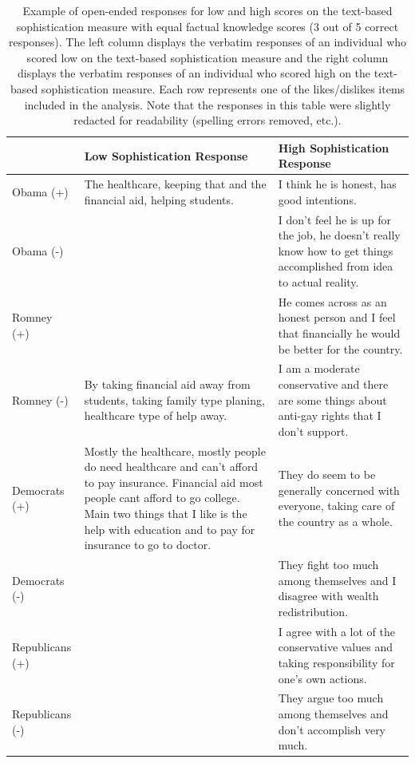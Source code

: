\documentclass[12pt]{article}
\begin{document}
\begin{table}[ht]\footnotesize\centering
\begin{tabular}{l|p{6.5cm}|p{6.5cm}}
   \toprule
  & Low Sophistication Response & High Sophistication Response \\ 
   \midrule
   Obama (+) & The healthcare, keeping that and the financial aid, helping students. & I think he is honest, has good intentions. \\ \hdashline
     Obama (-) &  & I don't feel he is up for the job, he doesn't really know how to get things accomplished from idea to actual reality. \\ \hdashline
     Romney (+) &  & He comes across as an honest person and I feel that financially he would be better for the country. \\ \hdashline
     Romney (-) & By taking financial aid away from students, taking family type planing, healthcare type of help away. & I am a moderate conservative and there are some things about anti-gay rights that I don't support. \\ \hdashline
     Democrats (+) & Mostly the healthcare, mostly people do need healthcare and can't afford to pay insurance. Financial aid most people cant afford to go college. Main two things that I like is the help with education and to pay for insurance to go to doctor. & They do seem to be generally concerned with everyone, taking care of the country as a whole. \\ \hdashline
     Democrats (-) &  & They fight too much among themselves and I disagree with wealth redistribution. \\ \hdashline
     Republicans (+) &  & I agree with a lot of the conservative values and taking responsibility for one's own actions. \\ \hdashline
     Republicans (-) &  & They argue too much among themselves and don't accomplish very much. \\ 
    \bottomrule
 \end{tabular}
\caption{Example of open-ended responses for low and high scores on the text-based sophistication measure with equal factual knowledge scores (3 out of 5 correct responses). The left column displays the verbatim responses of an individual who scored low on the text-based sophistication measure and the right column displays the verbatim responses of an individual who scored high on the text-based sophistication measure. Each row represents one of the likes/dislikes items included in the analysis. Note that the responses in this table were slightly redacted for readability (spelling errors removed, etc.).}\label{tab:ex1}
\end{table}
\end{document}
